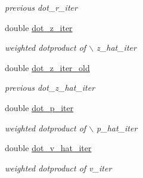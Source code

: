 \begin{CompactItemize}
\begin{CompactList}\small\item\em previous dot\_\-r\_\-iter \item\end{CompactList}\item 
\hypertarget{structinnfft__adjoint__plan_ae72bba8cc1a211c1b3931c969f95a85}{
double \hyperlink{structinnfft__adjoint__plan_ae72bba8cc1a211c1b3931c969f95a85}{dot\_\-z\_\-iter}}
\label{structinnfft__adjoint__plan_ae72bba8cc1a211c1b3931c969f95a85}

\begin{CompactList}\small\item\em weighted dotproduct of $\backslash$ z\_\-hat\_\-iter \item\end{CompactList}\item 
\hypertarget{structinnfft__adjoint__plan_669c48fd77d0d04bf0adc4ebedbd699f}{
double \hyperlink{structinnfft__adjoint__plan_669c48fd77d0d04bf0adc4ebedbd699f}{dot\_\-z\_\-iter\_\-old}}
\label{structinnfft__adjoint__plan_669c48fd77d0d04bf0adc4ebedbd699f}

\begin{CompactList}\small\item\em previous dot\_\-z\_\-hat\_\-iter \item\end{CompactList}\item 
\hypertarget{structinnfft__adjoint__plan_3d20a53eb3c0158cc401d7b0d640da07}{
double \hyperlink{structinnfft__adjoint__plan_3d20a53eb3c0158cc401d7b0d640da07}{dot\_\-p\_\-iter}}
\label{structinnfft__adjoint__plan_3d20a53eb3c0158cc401d7b0d640da07}

\begin{CompactList}\small\item\em weighted dotproduct of $\backslash$ p\_\-hat\_\-iter \item\end{CompactList}\item 
\hypertarget{structinnfft__adjoint__plan_5d9a12eacf094e7f9e771add0a3874d5}{
double \hyperlink{structinnfft__adjoint__plan_5d9a12eacf094e7f9e771add0a3874d5}{dot\_\-v\_\-hat\_\-iter}}
\label{structinnfft__adjoint__plan_5d9a12eacf094e7f9e771add0a3874d5}

\begin{CompactList}\small\item\em weighted dotproduct of v\_\-iter \item\end{CompactList}\end{CompactItemize}


